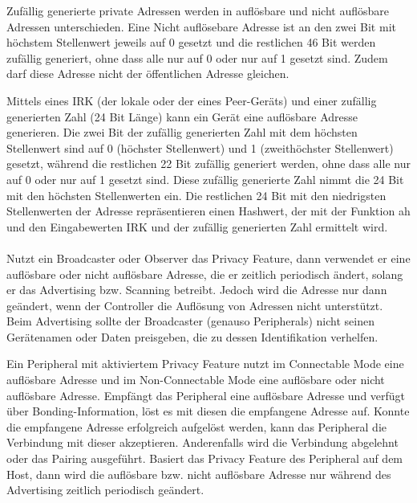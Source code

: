 Zufällig generierte private Adressen werden in auflösbare und nicht auflösbare Adressen unterschieden. Eine Nicht auflösebare Adresse ist an den zwei Bit mit höchstem Stellenwert jeweils auf 0 gesetzt und die restlichen 46 Bit werden zufällig generiert, ohne dass alle nur auf 0 oder nur auf 1 gesetzt sind. Zudem darf diese Adresse nicht der öffentlichen Adresse gleichen.

Mittels eines IRK (der lokale oder der eines Peer-Geräts) und einer zufällig generierten Zahl (24 Bit Länge) kann ein Gerät eine auflösbare Adresse generieren. Die zwei Bit der zufällig generierten Zahl mit dem höchsten Stellenwert sind auf 0 (höchster Stellenwert) und 1 (zweithöchster Stellenwert) gesetzt, während die restlichen 22 Bit zufällig generiert werden, ohne dass alle nur auf 0 oder nur auf 1 gesetzt sind. Diese zufällig generierte Zahl nimmt die 24 Bit mit den höchsten Stellenwerten ein. Die restlichen 24 Bit mit den niedrigsten Stellenwerten der Adresse repräsentieren einen Hashwert, der mit der Funktion ah \cite{BtSpec4.2_2287} 
und den Eingabewerten IRK und der zufällig generierten Zahl ermittelt wird. \cite{BtSpec4.2_2577-2579}
\\\\

Nutzt ein Broadcaster oder Observer das Privacy Feature, dann verwendet er eine auflösbare oder nicht auflösbare Adresse, die er zeitlich periodisch ändert, solang er das Advertising bzw. Scanning betreibt. Jedoch wird die Adresse nur dann geändert, wenn der Controller die Auflösung von Adressen nicht unterstützt. Beim Advertising sollte der Broadcaster (genauso Peripherals) nicht seinen Gerätenamen oder Daten preisgeben, die zu dessen Identifikation verhelfen. \cite{BtSpec4.2_2078-2079}

Ein Peripheral mit aktiviertem Privacy Feature nutzt im Connectable Mode eine auflösbare Adresse und im Non-Connectable Mode eine auflösbare oder nicht auflösbare Adresse. Empfängt das Peripheral eine auflösbare Adresse und verfügt über Bonding-Information, löst es mit diesen die empfangene Adresse auf. Konnte die empfangene Adresse erfolgreich aufgelöst werden, kann das Peripheral die Verbindung mit dieser akzeptieren. Anderenfalls wird die Verbindung abgelehnt oder das Pairing ausgeführt. Basiert das Privacy Feature des Peripheral auf dem Host, dann wird die auflösbare bzw. nicht auflösbare Adresse nur während des Advertising zeitlich periodisch geändert. \cite{BtSpec4.2_2077}

